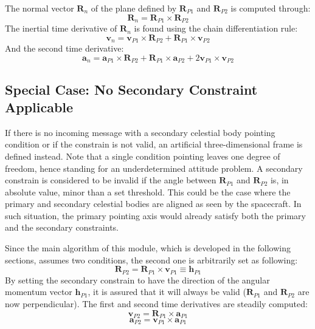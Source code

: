 The normal vector $\bm{R}_{n}$ of the plane defined by $\bm{R}_{P1}$ and $\bm{R}_{P2}$ is computed through:
\begin{equation}
	\bm R_{n} =\bm{R}_{P1} \times \bm{R}_{P2}
\end{equation}
The inertial time derivative of $\bm{R}_n$ is found using the chain differentiation rule:
\begin{equation}
	\bm {v}_{n} = \bm{v}_{P1} \times \bm{R}_{P2} + \bm{R}_{P1} \times \bm{v}_{P2}
\end{equation}
And the second time derivative:
\begin{equation}
	\bm {a}_{n} = \bm{a}_{P1} \times \bm{R}_{P2} + \bm{R}_{P1} \times \bm{a}_{P2}  + 2 \bm{v}_{P1} \times \bm{v}_{P2}
\end{equation}
\subsection{ Special Case: No Secondary Constraint Applicable}
If there is no incoming message with a secondary celestial body pointing condition or if the constrain is not valid, an artificial three-dimensional frame is defined instead. Note that a single condition pointing leaves one degree of freedom, hence standing for an underdetermined attitude problem. A secondary constrain is considered to be invalid if the angle between $\bm{R}_{P1}$ and $\bm{R}_{P2}$ is, in absolute value, minor than a set threshold. This could be the case where the primary and secondary celestial bodies are aligned as seen by the spacecraft. In such situation, the primary pointing axis would already satisfy both the primary and the secondary constraints.

Since the main algorithm of this module, which is developed in the following sections, assumes two conditions, the second one is arbitrarily set as following:
\begin{equation}
	\bm{R}_{P2} = \bm{R}_{P1} \times \bm{v}_{P1} \equiv  \bm{h}_{P1}
\end{equation}
By setting the secondary constrain to have the direction of the angular momentum vector $ \bm{h}_{P1}$, it is assured that it will always be valid ($\bm{R}_{P1}$ and $\bm{R}_{P2}$ are now perpendicular).
The first and second time derivatives are steadily computed:
\begin{equation}
	\bm{v}_{P2} =  \bm{R}_{P1} \times \bm{a}_{P1}
\end{equation}
\begin{equation}
	\bm{a}_{P2} =  \bm{v}_{P1} \times \bm{a}_{P1}
\end{equation}
